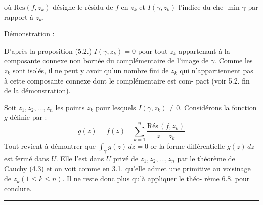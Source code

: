 
où $\mathrm{Res}(f,z_k)$ désigne le résidu de $f$ en $z_k$ et $I(\gamma,z_k)$ l'indice du che-%
min $\gamma$ par rapport à $z_k$.

\uline{Démonstration} :

D'après la proposition (5.2.) $I(\gamma,z_k) = 0$ pour tout $z_k$ appartenant
à la composante connexe non bornée du complémentaire de l'image de $\gamma$.
Comme les $z_k$ sont isolés, il ne peut y avoir qu'un nombre fini de $z_k$ qui
n'appartiennent pas à cette composante connexe dont le complémentaire est com-%
pact (voir 5.2. fin de la démonstration).

Soit $z_1,z_2,\dots,z_n$ les points $z_k$ pour lesquels $I(\gamma,z_k) \neq 0$.
Considérons la fonction $g$ définie par :
\[ g(z) = f(z) \quad \sum_{k=1}^{n} \frac{\mathrm{Rés}\,(f,z_k)}{z-z_k} \]
Tout revient à démontrer que $\displaystyle\int_\gamma g(z)\,dz = 0$ or la forme différentielle
$g(z)\,dz$ est fermé dans $U$. Elle l'est dans $U$ privé de $z_1,z_2,\dots,z_n$ par le
théorème de Cauchy (4.3) et on voit comme en 3.1. qu'elle admet une primitive
au voisinage de $z_k(1 \leq k \leq n)$. Il ne reste donc plus qu'à appliquer le théo-%
rème 6.8. pour conclure.

\begin{center}\rule{4cm}{0.4pt}\end{center}

